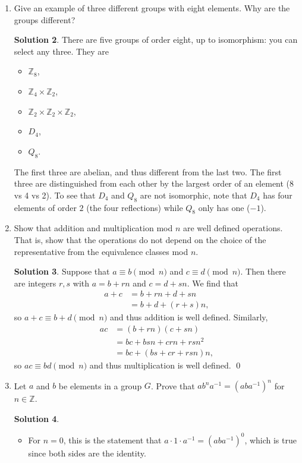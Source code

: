 \documentclass{article}
\newcommand{\ZZ}{\mathbb{Z}}
\theoremstyle{definition}
\newtheorem*{solution}{Solution}
\begin{document}
\begin{enumerate}
\begin{solution}
\end{solution}
\item[3.17.] Give an example of three different groups with eight elements.  Why are the groups different?
\begin{solution}
There are five groups of order eight, up to isomorphism: you can select any three.  They are
\begin{itemize}
\item $\ZZ_8$,
\item $\ZZ_4 \times \ZZ_2$,
\item $\ZZ_2 \times \ZZ_2 \times \ZZ_2$,
\item $D_4$,
\item $Q_8$.
\end{itemize}
The first three are abelian, and thus different from the last two.  The first three are distinguished from each other by the largest order of an element (8 vs 4 vs 2).  To see that $D_4$ and $Q_8$ are not isomorphic, note that $D_4$ has four elements of order $2$ (the four reflections) while $Q_8$ only has one ($-1$).  
\end{solution}
\item[3.22.] Show that addition and multiplication mod $n$ are well defined operations.  That is, show that the operations do not depend on the choice of the representative from the equivalence classes mod $n$.
\begin{solution}
Suppose that $a \equiv b \pmod{n}$ and $c \equiv d \pmod{n}$.  Then there are integers $r,s$ with $a = b + rn$ and $c = d + sn$.  We find that
\begin{align*}
a + c &= b + rn + d + sn \\
&= b + d + (r+s)n,
\end{align*}
so $a + c \equiv b + d \pmod{n}$ and thus addition is well defined.  Similarly,
\begin{align*}
ac &= (b + rn)(c+sn) \\
&= bc + bsn + crn + rsn^2 \\
&= bc + (bs + cr + rsn)n,
\end{align*}
so $ac \equiv bd \pmod{n}$ and thus multiplication is well defined. \qed
\end{solution}
\item[3.25.] Let $a$ and $b$ be elements in a group $G$.  Prove that $ab^na^{-1} = (aba^{-1})^n$ for $n \in \ZZ$.
\begin{solution} $ $
\begin{itemize}
\item For $n = 0$, this is the statement that $a \cdot 1 \cdot a^{-1} = (aba^{-1})^0$, which is true since both sides are the identity.

\end{itemize}
\end{solution}
\end{enumerate}
\end{document}
